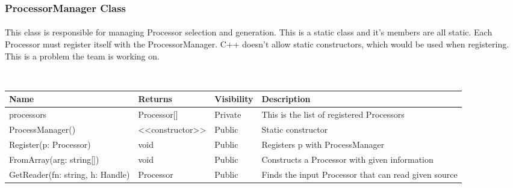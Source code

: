 \skipsubsection

\subsubsection{ProcessorManager Class}
\paragraph{}
\normalsize
This class is responsible for managing Processor selection and generation. This is a static class and it's members are all static. Each Processor must register itself with the ProcessorManager. C++ doesn't allow static constructors, which would be used when registering. This is a problem the team is working on.\\

\begin{center}
	\\[0.8cm]
	\begin{tabular}{|p{4cm}|p{2.2cm}|p{1.8cm}|p{6cm}|}
		\hline 
			Name & Returns & Visibility & Description \\
		\hline 
			processors & Processor[] & Private & This is the list of registered Processors\\
		\hline 
			ProcessManager() & <<constructor>> & Public & Static constructor \\
		\hline 
			Register(p: Processor) & void & Public & Registers p with ProcessManager \\
		\hline
			FromArray(arg: string[]) & void & Public & Constructs a Processor with given information \\
		\hline
			GetReader(fn: string, h: Handle) & Processor & Public & Finds the input Processor that can read given source\\
		\hline
	\end{tabular}
\end{center}

\skipsubsection